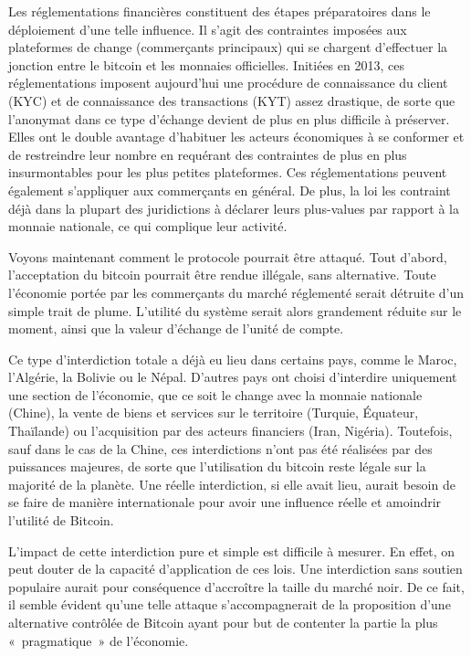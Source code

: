 Les réglementations financières constituent des étapes préparatoires dans le déploiement d'une telle influence. Il s'agit des contraintes imposées aux plateformes de change (commerçants principaux) qui se chargent d'effectuer la jonction entre le bitcoin et les monnaies officielles. Initiées en 2013, ces réglementations imposent aujourd'hui une procédure de connaissance du client (KYC) et de connaissance des transactions (KYT) assez drastique, de sorte que l'anonymat dans ce type d'échange devient de plus en plus difficile à préserver. Elles ont le double avantage d'habituer les acteurs économiques à se conformer et de restreindre leur nombre en requérant des contraintes de plus en plus insurmontables pour les plus petites plateformes. Ces réglementations peuvent également s'appliquer aux commerçants en général. De plus, la loi les contraint déjà dans la plupart des juridictions à déclarer leurs plus-values par rapport à la monnaie nationale, ce qui complique leur activité.

Voyons maintenant comment le protocole pourrait être attaqué. Tout d'abord, l'acceptation du bitcoin pourrait être rendue illégale, sans alternative. Toute l'économie portée par les commerçants du marché réglementé serait détruite d'un simple trait de plume. L'utilité du système serait alors grandement réduite sur le moment, ainsi que la valeur d'échange de l'unité de compte.

Ce type d'interdiction totale a déjà eu lieu dans certains pays, comme le Maroc, l'Algérie, la Bolivie ou le Népal. D'autres pays ont choisi d'interdire uniquement une section de l'économie, que ce soit le change avec la monnaie nationale (Chine), la vente de biens et services sur le territoire (Turquie, Équateur, Thaïlande) ou l'acquisition par des acteurs financiers (Iran, Nigéria). Toutefois, sauf dans le cas de la Chine, ces interdictions n'ont pas été réalisées par des puissances majeures, de sorte que l'utilisation du bitcoin reste légale sur la majorité de la planète. Une réelle interdiction, si elle avait lieu, aurait besoin de se faire de manière internationale pour avoir une influence réelle et amoindrir l'utilité de Bitcoin.

L'impact de cette interdiction pure et simple est difficile à mesurer. En effet, on peut douter de la capacité d'application de ces lois. Une interdiction sans soutien populaire aurait pour conséquence d'accroître la taille du marché noir. De ce fait, il semble évident qu'une telle attaque s'accompagnerait de la proposition d'une alternative contrôlée de Bitcoin ayant pour but de contenter la partie la plus «~pragmatique~» de l'économie.

